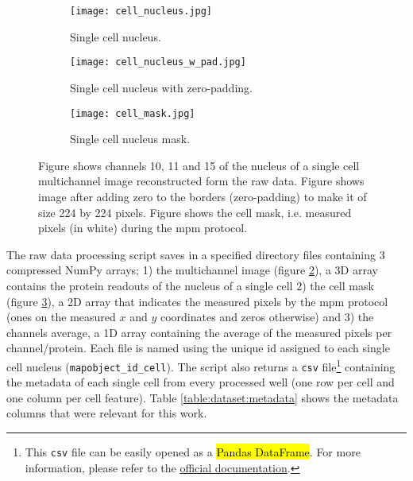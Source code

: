 \begin{figure}[htb]
  \centering
  \begin{subfigure}[t]{.211\linewidth}
    \texttt{[image: cell\_nucleus.jpg]}
    \caption{Single cell nucleus.}
    \label{fig:data_pp:sample_cell:nucleus}
  \end{subfigure}
  \hspace{4mm}
  \begin{subfigure}[t]{.3\linewidth}
    \texttt{[image: cell\_nucleus\_w\_pad.jpg]}
    \caption{Single cell nucleus with zero-padding.}
    \label{fig:data_pp:sample_cell:nucleus_pad}
  \end{subfigure}
  \hspace{4mm}
  \begin{subfigure}[t]{.3\linewidth}
    \texttt{[image: cell\_mask.jpg]}
    \caption{Single cell nucleus mask.}
    \label{fig:data_pp:sample_cell:cell_mask}
  \end{subfigure}
  \caption{Figure  shows channels 10, 11 and 15 of the nucleus of a single cell multichannel image reconstructed form the raw data. Figure  shows image  after adding zero to the borders (zero-padding) to make it of size 224 by 224 pixels. Figure  shows the cell mask, i.e. measured pixels (in white) during the \gls{mpm} protocol.}
  \label{fig:data_pp:sample_cell}
\end{figure}

The raw data processing script saves in a specified directory files containing 3 compressed NumPy arrays; 1) the multichannel image (figure \ref{fig:data_pp:sample_cell:nucleus_pad}), a 3D array contains the protein readouts of the nucleus of a single cell 2) the cell mask (figure \ref{fig:data_pp:sample_cell:cell_mask}), a 2D array that indicates the measured pixels by the \gls{mpm} protocol (ones on the measured $x$ and $y$ coordinates and zeros otherwise) and 3) the channels average, a 1D array containing the average of the measured pixels per channel/protein. Each file is named using the unique id assigned to each single cell nucleus (\texttt{mapobject\_id\_cell}). The script also returns a \texttt{csv} file\footnote{This \texttt{csv} file can be easily opened as a \hl{Pandas DataFrame}. For more information, please refer to the \href{https://pandas.pydata.org/pandas-docs/stable/reference/api/pandas.DataFrame.html}{official documentation}.} containing the metadata of each single cell from every processed well (one row per cell and one column per cell feature). Table \ref{table:dataset:metadata} shows the metadata columns that were relevant for this work.

